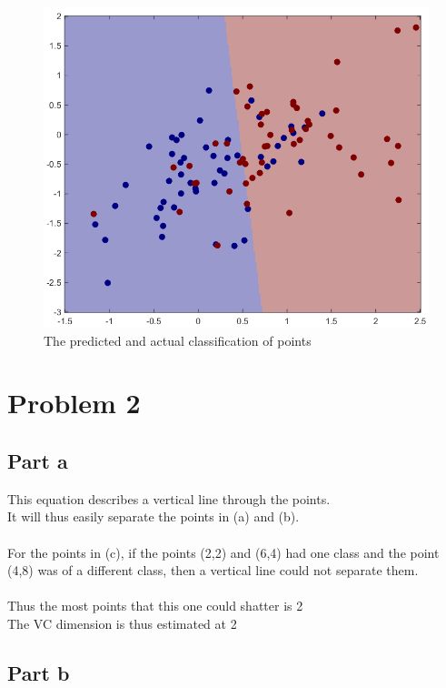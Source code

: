 \documentclass[twoside,11pt]{article}
\theoremstyle{definition}
\begin{document}
\begin{figure}[h]
\centering
\includegraphics[width=5 in]{prob1fPlotB2.png}
\caption{The predicted and actual classification of points}
\end{figure}

\newpage

\section*{Problem 2}

\subsection*{Part a}

This equation describes a vertical line through the points.\\
It will thus easily separate the points in (a) and (b).\\
\\
For the points in (c), if the points (2,2) and (6,4) had one class and the point (4,8) was of a different class, then a vertical line could not separate them.\\
\\
Thus the most points that this one could shatter is 2\\
The VC dimension is thus estimated at 2

\subsection*{Part b}
\end{document}
